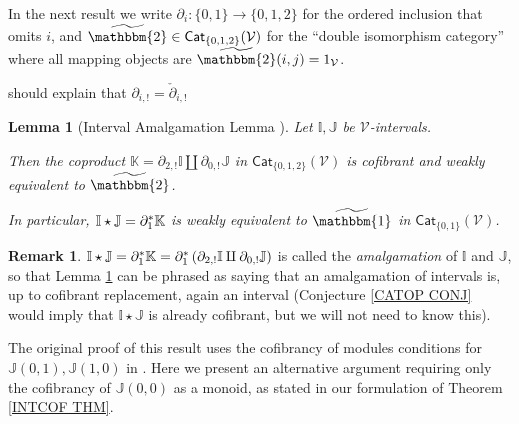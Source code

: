 \documentclass[a4paper,10pt
,draft
]{article}%
\numberwithin{equation}{section}
\numberwithin{figure}{section}
\newtheorem{lemma}[equation]{Lemma}%
\theoremstyle{definition} %
\newtheorem{remark}[equation]{Remark}%
\newcommand{\V}{\ensuremath{\mathcal V}}
\newcommand{\1}{\ensuremath{\mathbbm 1}}%
\begin{document}
In the next result we write 
$\partial_i \colon \{0,1\} \to \{0,1,2\}$
for the ordered inclusion that omits $i$,
and  
$\widetilde{\mathbbm{2}} \in
\mathsf{Cat}_{\{0,1,2\}}(\V)$
for the ``double isomorphism category''
where all mapping objects are $\widetilde{\mathbbm{2}}(i,j)=1_{\V}$.


{\color{red} should explain that 
	$\partial_{i,!} = \check{\partial}_{i,!}$}

\begin{lemma}[Interval Amalgamation Lemma {\cite[Lemma 1.16]{BM13}}]
\label{AMALGLEM LEM}
Let $\mathbb{I},\mathbb{J}$ be $\V$-intervals.

Then the coproduct 
$\mathbb{K} = \partial_{2,!} \mathbb{I} \amalg \partial_{0,!} \mathbb{J}$
in $\mathsf{Cat}_{\{0,1,2\}}(\V)$
is cofibrant and weakly equivalent to $\widetilde{\mathbbm{2}}$.

In particular, 
$\mathbb{I} \star \mathbb{J} = \partial_1^{\**}\mathbb{K}$
is weakly equivalent to $\widetilde{\mathbbm{1}}$
in $\mathsf{Cat}_{\{0,1\}}(\V)$.
\end{lemma}


\begin{remark}
$\mathbb{I} \star \mathbb{J} = 
\partial_1^{\**} \mathbb{K} =
\partial_1^{\**} \left(\partial_{2,!} \mathbb{I} \amalg \partial_{0,!} \mathbb{J}\right)$
is called the \emph{amalgamation} of $\mathbb{I}$ and $\mathbb{J}$,
so that Lemma \ref{AMALGLEM LEM} can be phrased as saying that an amalgamation of intervals is,
up to cofibrant replacement, again an interval
(Conjecture \ref{CATOP CONJ} would imply that $\mathbb{I} \star \mathbb{J}$ is already cofibrant, 
but we will not need to know this).
\end{remark}


The original proof of this result \cite[Lemma 1.16]{BM13} uses the cofibrancy of modules conditions for
$\mathbb{J}(0,1),\mathbb{J}(1,0)$
in \cite[Thm 1.15]{BM13}.
Here we present an alternative argument requiring only the cofibrancy of $\mathbb{J}(0,0)$ as a monoid,
as stated in our formulation of Theorem \ref{INTCOF THM}.
\end{document}
